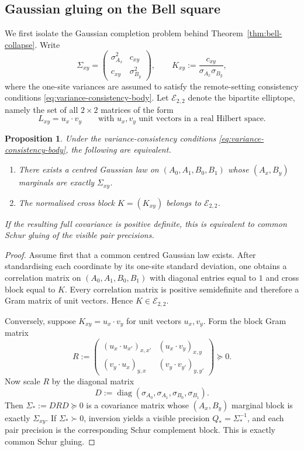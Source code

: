 \documentclass[11pt]{article}
\numberwithin{equation}{section}
\theoremstyle{thmcompact}
\newtheorem{proposition}[theorem]{Proposition}
\theoremstyle{remark}
\begin{document}
\subsection{Gaussian gluing on the Bell square}

We first isolate the Gaussian completion problem behind Theorem~\ref{thm:bell-collapse}. Write
\[
\Sigma_{xy}=\begin{pmatrix}\sigma_{A_x}^2 & c_{xy}\\ c_{xy} & \sigma_{B_y}^2\end{pmatrix},
\qquad
K_{xy}:=\frac{c_{xy}}{\sigma_{A_x}\sigma_{B_y}},
\]
where the one-site variances are assumed to satisfy the remote-setting consistency conditions \eqref{eq:variance-consistency-body}. Let $\mathcal E_{2,2}$ denote the bipartite elliptope, namely the set of all $2\times2$ matrices of the form
\[
L_{xy}=u_x\cdot v_y
\qquad
\text{with }u_x,v_y\text{ unit vectors in a real Hilbert space}.
\]

\begin{proposition}\label{prop:bell-elliptope}
Under the variance-consistency conditions \eqref{eq:variance-consistency-body}, the following are equivalent.
\begin{enumerate}
\item There exists a centred Gaussian law on $(A_0,A_1,B_0,B_1)$ whose $(A_x,B_y)$ marginals are exactly $\Sigma_{xy}$.
\item The normalised cross block $K=(K_{xy})$ belongs to $\mathcal E_{2,2}$.
\end{enumerate}
If the resulting full covariance is positive definite, this is equivalent to common Schur gluing of the visible pair precisions.
\end{proposition}

\begin{proof}
Assume first that a common centred Gaussian law exists. After standardising each coordinate by its one-site standard deviation, one obtains a correlation matrix on $(A_0,A_1,B_0,B_1)$ with diagonal entries equal to $1$ and cross block equal to $K$. Every correlation matrix is positive semidefinite and therefore a Gram matrix of unit vectors. Hence $K\in\mathcal E_{2,2}$.

Conversely, suppose $K_{xy}=u_x\cdot v_y$ for unit vectors $u_x,v_y$. Form the block Gram matrix
\[
R:=\begin{pmatrix}
(u_x\cdot u_{x'})_{x,x'} & (u_x\cdot v_y)_{x,y}\\
(v_y\cdot u_x)_{y,x} & (v_y\cdot v_{y'})_{y,y'}
\end{pmatrix}\succeq 0.
\]
Now scale $R$ by the diagonal matrix
\[
D:=\operatorname{diag}(\sigma_{A_0},\sigma_{A_1},\sigma_{B_0},\sigma_{B_1}).
\]
Then $\Sigma_\ast:=DRD\succeq 0$ is a covariance matrix whose $(A_x,B_y)$ marginal block is exactly $\Sigma_{xy}$. If $\Sigma_\ast\succ0$, inversion yields a visible precision $Q_\ast=\Sigma_\ast^{-1}$, and each pair precision is the corresponding Schur complement block. This is exactly common Schur gluing.
\end{proof}
\end{document}
